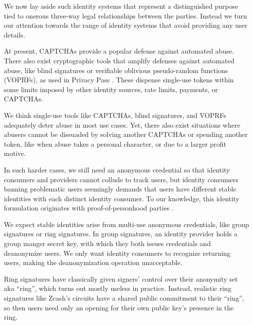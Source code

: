 We now lay aside such identity systems that represent a distinguished purpose tied to onerous three-way legal relationships between the parties.  Instead we turn our attention towards the range of identity systems that avoid providing any user details.  

At present, CAPTCHAs provide a popular defense against automated abuse.  There also exist cryptographic tools that amplify defenses against automated abuse, like blind signatures or verifiable oblivious pseudo-random functions (VOPRFs), as used in Privacy Pass \cite{privacypass}.  These dispense single-use tokens within some limits imposed by other identity sources, rate limits, payments, or CAPTCHAs.  

We think single-use tools like CAPTCHAs, blind signatures, and VOPRFs adequately deter abuse in most use cases.  Yet, there also exist situations where abusers cannot be dissuaded by solving another CAPTCHAs or spending another token, like when abuse takes a personal character, or due to a larger profit motive.  

In such harder cases, we still need an anonymous credential so that identity consumers and providers cannot collude to track users, but identity consumers banning problematic users seemingly demands that users have different stable identities with each distinct identity consumer.  
To our knowledge, this identity formulation originates with proof-of-personhood parties \cite{pop2008,pop2017}.

We expect stable identities arise from multi-use anonymous credentials, like group signatures or ring signatures.  In group signatures, an identity provider holds a group manger secret key, with which they both issues credentials and deanonymize users.  We only want identity consumers to recognize returning users, making the deanonymization operation unacceptable.  

Ring signatures have classically given signers' control over their anonymity set aka ``ring'', which turns out mostly useless in practice.  Instead, realistic ring signatures like Zcash's circuits \cite{zcash_prorocol} have a shared public commitment to their ``ring'', so then users need only an opening for their own public key's presence in the ring. 






